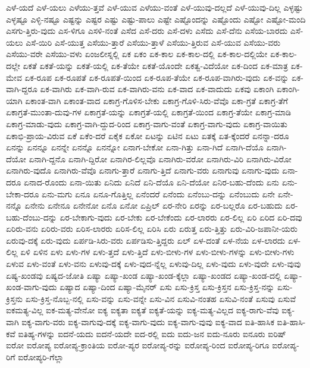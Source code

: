 {ಎಳೆ-ಯದೆ
ಎಳೆ-ಯಲು
ಎಳೆಯು-ತ್ತವೆ
ಎಳೆ-ಯುವ
ಎಳೆಯು-ವಂತೆ
ಎಳೆ-ಯುವು-ದಲ್ಲದೆ
ಎಳೆ-ಯುವು-ದಿಲ್ಲ
ಎಳ್ಳಷ್ಟು
ಎಳ್ಳಷ್ಟೂ
ಎಳ್ಳಿ-ನಷ್ಟೂ
ಎಷ್ಟನ್ನು
ಎಷ್ಟರ
ಎಷ್ಟು
ಎಷ್ಟು-ಪಾಲು
ಎಷ್ಟೇ
ಎಷ್ಟೊಂದನ್ನು
ಎಷ್ಟೊಂದು
ಎಷ್ಟೋ
ಎಷ್ಟೋ-ಮಂದಿ
ಎಸಗು-ತ್ತಿರು-ವುದು
ಎಸ-ಳಿಗೂ
ಎಸಳಿ-ನಂತೆ
ಎಸೆದ
ಎಸೆ-ದರು
ಎಸೆ-ದಳು
ಎಸೆದು
ಎಸೆ-ದೆನು
ಎಸೆಯ-ಬಾರದು
ಎಸೆ-ಯಲು
ಎಸೆ-ಯಿರಿ
ಎಸೆ-ಯುತ್ತ
ಎಸೆಯು-ತ್ತಾರೆ
ಎಸೆಯು-ತ್ತಾಳೆ
ಎಸೆಯು-ತ್ತಿರುವ
ಎಸೆ-ಯುವ
ಎಸೆಯು-ವರು
ಎಸೆಯು-ವರೇ
ಎಸೆಯು-ವಳು
ಏಂಜಲೀಸ್ನಲ್ಲಿ
ಏಕ
ಏಕಂ
ಏಕ-ಕಾಲ
ಏಕ-ಕಾಲ-ದಲ್ಲಿ
ಏಕ-ಕಾಲ-ದಲ್ಲಿಯೇ
ಏಕ-ಕಾಲ-ದಲ್ಲೇ
ಏಕತೆ
ಏಕತೆ-ಯನ್ನು
ಏಕತೆ-ಯಲ್ಲಿ
ಏಕ-ತೆಯೇ
ಏಕತೆ-ಯೊಂದೇ
ಏಕತ್ವ-ವಿದೆಯೋ
ಏಕ-ದಿಂದ
ಏಕ-ಮಾತ್ರ
ಏಕ-ಮೇವ
ಏಕ-ರೂಪ
ಏಕ-ರೂಪತೆ
ಏಕ-ರೂಪತೆ-ಯಿಂದ
ಏಕ-ರೂಪ-ತೆಯೇ
ಏಕ-ರೂಪ-ವಾಗಿರು-ವುದು
ಏಕ-ವನ್ನು
ಏಕ-ವಾಗಿ-ದ್ದರೂ
ಏಕ-ವಾಗಿರು
ಏಕ-ವಾಗಿ-ರುವ
ಏಕ-ವಾಗಿರು-ವನು
ಏಕ-ವಾದ
ಏಕ-ವಾದುದು
ಏಕವು
ಏಕಾಂಗಿ
ಏಕಾಂಗಿ-ಯಾಗಿ
ಏಕಾಂತ-ವಾಗಿ
ಏಕಾಂತ-ವಾದ
ಏಕಾಗ್ರ-ಗೊಳಿಸ-ಬೇಕು
ಏಕಾಗ್ರ-ಗೊಳಿ-ಸಿರು-ವೆವೊ
ಏಕಾ-ಗ್ರತೆ
ಏಕಾಗ್ರ-ತೆಗೆ
ಏಕಾಗ್ರತೆ-ಮುಂತಾ-ದುವು-ಗಳ
ಏಕಾಗ್ರತೆ-ಯನ್ನು
ಏಕಾಗ್ರತೆ-ಯಲ್ಲಿ
ಏಕಾಗ್ರತೆ-ಯಿಂದ
ಏಕಾಗ್ರ-ತೆಯೇ
ಏಕಾಗ್ರ-ಮಾಡಿ
ಏಕಾಗ್ರ-ಮಾಡು-ವುದು
ಏಕಾಗ್ರ-ವಾಗಿ-ದ್ದುದ-ರಿಂದ
ಏಕಾಗ್ರ-ವಾಗು-ವಂತೆ
ಏಕಾಗ್ರ-ವಾಗು-ವುದು
ಏಕಾಗ್ರ-ವಾಯಿತು
ಏಕಾಭಿ-ಪ್ರಾಯ-ವಿರುವ
ಏಕೆ
ಏಕೆಂ-ದರೆ
ಏಕೈಕ
ಏಕೋ
ಏಟನ್ನು
ಏಟಿನ
ಏಟು
ಏತಕ್ಕೆ
ಏತ-ಕ್ಕೆಂದರೆ
ಏನನ್ನಾ-ದರೂ
ಏನನ್ನು
ಏನನ್ನೂ
ಏನನ್ನೇ
ಏನನ್ನೊ
ಏನನ್ನೋ
ಏನಾಗ-ಬೇಕೋ
ಏನಾ-ಗಿತ್ತು
ಏನಾ-ಗಿದೆ
ಏನಾಗಿ-ದೆಯೊ
ಏನಾಗಿ-ದೆಯೋ
ಏನಾಗಿ-ದ್ದನೊ
ಏನಾಗಿ-ದ್ದಿರೋ
ಏನಾಗಿರ-ಲಿಲ್ಲವೊ
ಏನಾಗಿರು-ವರೋ
ಏನಾಗಿರು-ವಿರಿ
ಏನಾಗಿರು-ವಿರೋ
ಏನಾಗಿರು-ವುದೊ
ಏನಾಗಿರು-ವೆವೊ
ಏನಾಗು-ತ್ತಾರೆ
ಏನಾಗು-ತ್ತಿದೆ
ಏನಾಗು-ವರು
ಏನಾಗುವು
ಏನಾಗು-ವುದು
ಏನಾ-ದರೂ
ಏನಾದ-ರೊಂದು
ಏನಾ-ಯಿತು
ಏನಿದು
ಏನಿದೆ
ಏನಿ-ದೆಯೊ
ಏನಿ-ದೆಯೋ
ಏನಿರ-ಬಹು-ದೆಂದು
ಏನು
ಏನು-ಬೇಕಾ-ದರೂ
ಏನು-ಮಗು
ಏನೂ
ಏನೂ-ಗೊತ್ತಿಲ್ಲ
ಏನೆಂದರೆ
ಏನೆಂದು
ಏನೆಂಬು-ದನ್ನು
ಏನೆಂಬುದು
ಏನೇ
ಏನೇ-ನನ್ನೊ
ಏನೇನು
ಏನೇನೂ
ಏನೇನೋ
ಏನೊ
ಏನೋ
ಏಪ್ರಿಲ್
ಏರ-ನೇರಿ
ಏರನ್ನು
ಏರ-ಬಲ್ಲರೊ
ಏರ-ಬಹುದು
ಏರ-ಬಹು-ದೆಂಬು-ದನ್ನು
ಏರ-ಬೇಕಾಗು-ವುದು
ಏರ-ಬೇಕು
ಏರ-ಬೇಕೆಂದು
ಏರ-ಲಾರರು
ಏರ-ಲಿಲ್ಲ
ಏರಿ
ಏರಿದ
ಏರಿ-ದವು
ಏರಿರು-ವನು
ಏರಿರು-ವರು
ಏರಿಸ-ಲಾರರು
ಏರಿಸ-ಲಿಲ್ಲ
ಏರಿಸಿ
ಏರು
ಏರುತ್ತ
ಏರು-ತ್ತಿತ್ತು
ಏರು-ವಿರಿ-ಜಪಾನೀ-ಯರು
ಏರುವು-ದಕ್ಕೆ
ಏರು-ವುದು
ಏರ್ಪಡಿ-ಸಿರು-ವರು
ಏರ್ಪಡಿಸು-ತ್ತಿದ್ದರು
ಏಲ್
ಏಳ-ದಂತೆ
ಏಳ-ನೆಯ
ಏಳ-ಲಾರದು
ಏಳ-ಲಿಲ್ಲ
ಏಳಿ
ಏಳಿನ
ಏಳು
ಏಳು-ಗಳ
ಏಳು-ತ್ತದೆ
ಏಳು-ತ್ತಿದೆ
ಏಳು-ಬೀಳು-ಗಳ
ಏಳು-ಬೀಳು-ಗಳನ್ನು
ಏಳು-ಬೀಳು-ಗಳು
ಏಳುವ
ಏಳು-ವಂತೆ
ಏಳು-ವನು
ಏಳುವು-ದಕ್ಕೆ
ಏಳು-ವುದ-ನ್ನೆಲ್ಲ
ಏಳುವು-ದಿಲ್ಲ
ಏಳು-ವುದು
ಏಳು-ವುದೇ
ಏಳು-ವುವು
ಏಷ್ಯ-ಖಂಡವು
ಏಷ್ಯದ-ಜೋತಿ
ಏಷ್ಯಾ
ಏಷ್ಯಾ-ಖಂಡ
ಏಷ್ಯಾ-ಖಂಡ-ಕ್ಕೆಲ್ಲಾ
ಏಷ್ಯಾ-ಖಂಡದ
ಏಷ್ಯಾ-ಖಂಡ-ದಲ್ಲಿ
ಏಷ್ಯಾ-ಖಂಡ-ವಾಗು-ವುದು
ಏಷ್ಯಾದ
ಏಷ್ಯಾ-ದಿಂದ
ಏಷ್ಯಾ-ಮೈನರ್
ಏಸು
ಏಸು-ಕ್ರಿಸ್ತ
ಏಸು-ಕ್ರಿಸ್ತನ
ಏಸು-ಕ್ರಿಸ್ತ-ನನ್ನು
ಏಸು-ಕ್ರಿಸ್ತನು
ಏಸು-ಕ್ರಿಸ್ತ-ನೊಬ್ಬ-ನಲ್ಲಿ
ಏಸು-ವನ್ನು
ಏಸು-ವನ್ನೇ
ಏಸು-ವಿನ
ಏಸುವಿ-ನಂತಹ
ಏಸುವಿ-ನಂತೆ
ಏಸುವು
ಏಸುವೆ
ಐಕಮತ್ಯ-ವಿಲ್ಲ
ಐಕ-ಮತ್ಯ-ವೇನೋ
ಐಕ್ಯ
ಐಕ್ಯತಾ
ಐಕ್ಯತೆ
ಐಕ್ಯತೆ-ಯನ್ನು
ಐಕ್ಯ-ಮತ್ಯ-ವಿಲ್ಲದ
ಐಕ್ಯ-ರಾಗು-ವೆವು
ಐಕ್ಯ-ವಾಗಿ
ಐಕ್ಯ-ವಾಗು-ವರು
ಐಕ್ಯ-ವಾಗುವು-ದಕ್ಕೆ
ಐಕ್ಯ-ವಾಗು-ವುದು
ಐಕ್ಯ-ವಾಗು-ವುವು
ಐಕ್ಯ-ವಾದ
ಐತಿ-ಹಾಸಿಕ
ಐತಿ-ಹಾಸಿ-ಕವೆ
ಐತಿಹ್ಯ-ಗಳನ್ನು
ಐದನೆ-ಯದು
ಐದನೆ-ಯದೇ
ಐದ-ರಲ್ಲಿ
ಐದು
ಐದು-ಜನ
ಐದು-ನೂರು
ಐನೂರು
ಐರಿಷ್
ಐರೋ
ಐರೋಪ್ಯ
ಐರೋಪ್ಯ-ಕ್ರಾಂತಿಯ
ಐರೋ-ಪ್ಯರ
ಐರೋಪ್ಯ-ರನ್ನು
ಐರೋಪ್ಯ-ರಿಂದ
ಐರೋಪ್ಯ-ರಿಗೂ
ಐರೋಪ್ಯ-ರಿಗೆ
ಐರೋಪ್ಯರಿ-ಗೆಲ್ಲಾ
}

